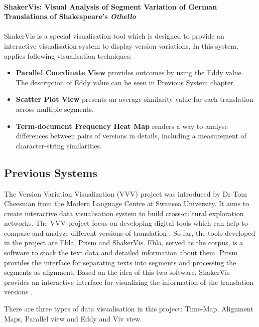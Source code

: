 \paragraph{ShakerVis: Visual Analysis of Segment Variation of German Translations of Shakespeare’s \emph{Othello}}
\paragraph[]{} ShakerVis \cite{Geng2015} is a special visualisation tool which is designed to provide an interactive visualisation system to display version variations. In this system, \cite{Geng2015} applies following visualisation techniques:

\begin{itemize}
	\item \textbf{Parallel Coordinate View} provides outcomes by using the Eddy value. The description of Eddy value can be seen in Previous System chapter.
	\item \textbf{Scatter Plot View} presents an average similarity value for each translation across multiple segments.
	\item \textbf{Term-document Frequency Heat Map} renders a way to analyse differences between pairs of versions in details, including a measurement of character-string similarities.
	
\end{itemize}

\subsection{Previous Systems}

The Version Variation Visualization (VVV) project was introduced by Dr Tom Cheesman from the Modern Language Centre at Swansea University. It aims to create interactive data visualisation system to build cross-cultural exploration networks. The VVV project focus on developing digital tools which can help to compare and analyze different versions of translation \cite{Cheesman2012}. So far, the tools developed in the project are Ebla, Prism and ShakerVis.  Ebla, served as the corpus, is a software to stock the text data and detailed information about them.  Prism provides the interface for separating texts into segments and processing the segments as alignment. Based on the idea of this two software, ShakerVis provides an interactive interface for visualizing the information of the translation versions \cite{Geng2015}.

There are three types of data visualisation in this project: Time-Map, Alignment Maps, Parallel view and Eddy and Viv view. 

